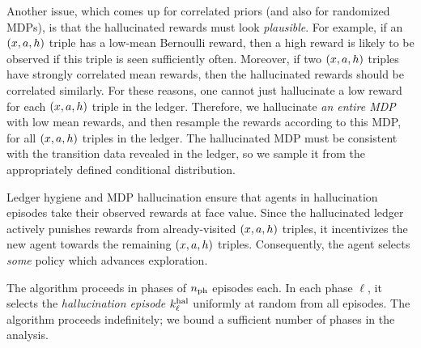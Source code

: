 
Another issue, which comes up for correlated priors (and also for randomized MDPs), is that the hallucinated rewards must look \emph{plausible}. For example, if an $(x,a,h)$ triple has a low-mean Bernoulli reward, then a high reward is likely to be observed if this triple is seen sufficiently often. Moreover, if two $(x,a,h)$ triples have strongly correlated mean rewards, then the hallucinated rewards should be correlated similarly. For these reasons, one cannot just hallucinate a low reward for each $(x,a,h)$ triple in the ledger.
Therefore, we hallucinate \emph{an entire MDP} with low mean rewards, and then resample the rewards according to this MDP, for all $(x,a,h)$ triples in the ledger. The hallucinated MDP must be consistent with the transition data revealed in the ledger, so we sample it from the appropriately defined conditional distribution.

Ledger hygiene and MDP hallucination ensure that agents in hallucination episodes take their observed rewards at face value. Since the hallucinated ledger actively punishes rewards from already-visited $(x,a,h)$ triples, it incentivizes the new agent towards the remaining $(x,a,h)$ triples. Consequently, the agent selects \emph{some} policy which advances exploration.


The algorithm proceeds in phases of $n_{\mathrm{ph}}$ episodes each. In each phase $\ell$, it selects the \emph{hallucination episode} $k^{\mathrm{hal}}_{\ell}$ uniformly at random from all episodes. %
The algorithm proceeds indefinitely; we bound a sufficient number of phases in the analysis.

